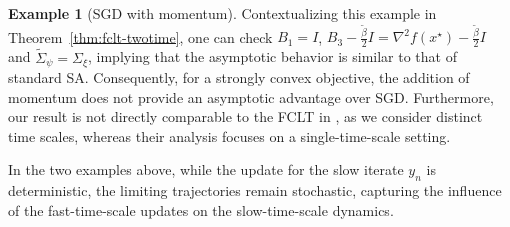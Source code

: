 \documentclass[11pt]{article}
\theoremstyle{plain}
\theoremstyle{definition}
\newtheorem{exam}{Example}[section]
\def\invdiffslow{\tilde{\beta}}
\def\mI{{\bm{I}}}
\def\mI{{I}}
\begin{document}
\begin{exam}[SGD with momentum]
	Contextualizing this example in Theorem~\ref{thm:fclt-twotime}, one can check
	$B_1 = \mI$, $B_3 - \frac{\invdiffslow}{2} \mI = \nabla^2 f(x^\star) - \frac{\invdiffslow}{2} \mI$ and $\widetilde{\Sigma}_{\psi} = \Sigma_{\xi}$, 
	implying that the asymptotic behavior is similar to that of standard SA.
	Consequently, for a strongly convex objective, the addition of momentum does not provide an asymptotic advantage over SGD. Furthermore, our result is not directly comparable to the FCLT in \cite{gadat2018stochastic}, as we consider distinct time scales, whereas their analysis focuses on a single-time-scale setting.
\end{exam}

In the two examples above, while the update for the slow iterate $y_{n}$ is deterministic, the limiting trajectories remain stochastic, capturing the influence of the fast-time-scale updates on the slow-time-scale dynamics.
\end{document}
